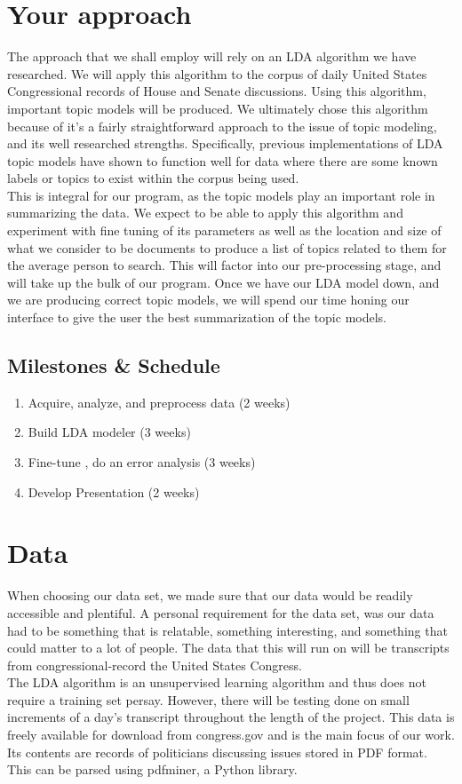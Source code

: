 \documentclass[11pt,a4paper]{article}
\begin{document}
\section{Your approach}
The approach that we shall employ will rely on an LDA algorithm we have researched. We will apply this algorithm to the corpus of daily United States Congressional records of House and Senate discussions. Using this algorithm, important topic models will be produced. We ultimately chose this algorithm because of it's a fairly straightforward approach to the issue of topic modeling, and its well researched strengths. Specifically, previous implementations of LDA topic models have shown to function well for data where there are some known labels or topics to exist within the corpus being used. \\
This is integral for our program, as the topic models play an important role in summarizing the data. We expect to be able to apply this algorithm and experiment with fine tuning of its parameters as well as the location and size of what we consider to be documents to produce a list of topics related to them for the average person to search. This will factor into our pre-processing stage, and will take up the bulk of our program. Once we have our LDA model down, and we are producing correct topic models, we will spend our time honing our interface to give the user the best summarization of the topic models. 

\subsection{Milestones \& Schedule}

\begin{enumerate}
    \item Acquire, analyze, and preprocess data (2 weeks)
    \item Build LDA modeler (3 weeks)
    \item Fine-tune , do an error analysis (3 weeks)
    \item Develop Presentation (2 weeks)
\end{enumerate}

\section{Data}
When choosing our data set, we made sure that our data would be readily accessible and plentiful. A personal requirement for the data set, was our data had to be something that is relatable, something interesting, and something that could matter to a lot of people. The data that this will run on will be transcripts from congressional-record the United States Congress. \\
The LDA algorithm is an unsupervised learning algorithm and thus does not require a training set persay. However, there will be testing done on small increments of a day's transcript throughout the length of the project. This data is freely available for download from congress.gov and is the main focus of our work. Its contents are records of politicians discussing issues stored in PDF format. This can be parsed using pdfminer, a Python library.
\end{document}
